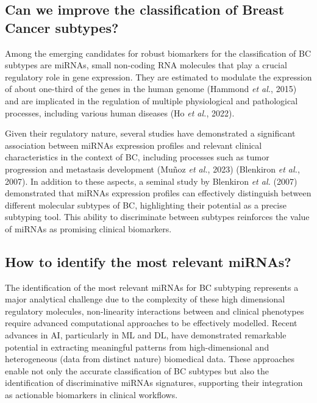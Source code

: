 \subsection{Can we improve the classification of Breast Cancer subtypes?}
Among the emerging candidates for robust biomarkers for the classification of  \gls{BC} subtypes are \gls{miRNAs}, 
small non-coding RNA molecules that play a crucial regulatory role in gene expression. They are estimated to 
modulate the expression of about one-third of the genes in the human genome \cite{mirna_importance_Hammond2015An} 
(Hammond \textit{et al.}, 2015) and are implicated in the regulation of multiple physiological and pathological 
processes, including various human diseases \cite{mirna_as_biomarkers_Ho2022} (Ho \textit{et al.}, 2022).

Given their regulatory nature, several studies have demonstrated a significant association between \gls{miRNAs} expression 
profiles and relevant clinical characteristics in the context of \gls{BC}, including processes such as tumor 
progression and metastasis development \cite{mirna_as_biomarkers_Ho2022} \cite{mirnas_in_bc_Muñoz2023} (Muñoz \textit{et al.}, 2023) 
\cite{mirna_as_bio_for_sub_Blenkiron2007MicroRNA} (Blenkiron \textit{et al.}, 2007). 
In addition to these aspects, a seminal 
study by Blenkiron \textit{et al.} (2007) demonstrated that \gls{miRNAs} expression profiles can effectively distinguish between 
different molecular subtypes of \gls{BC}, highlighting their potential as a precise subtyping tool. This ability to 
discriminate between subtypes reinforces the value of \gls{miRNAs} as promising clinical biomarkers.

\subsection{How to identify the most relevant miRNAs?}

The identification of the most relevant \gls{miRNAs} for \gls{BC} subtyping represents a major analytical challenge due 
to the complexity of these high dimensional regulatory molecules, non-linearity interactions between and 
clinical phenotypes require advanced computational approaches to be effectively modelled. Recent advances in \gls{AI}, 
particularly in \gls{ML} and \gls{DL}, have demonstrated remarkable potential in extracting meaningful patterns from 
high-dimensional and heterogeneous (data from distinct nature) biomedical data. These approaches enable not only the 
accurate classification of \gls{BC} subtypes but also the identification of discriminative \gls{miRNAs} signatures, 
supporting their integration as actionable biomarkers in clinical workflows.

